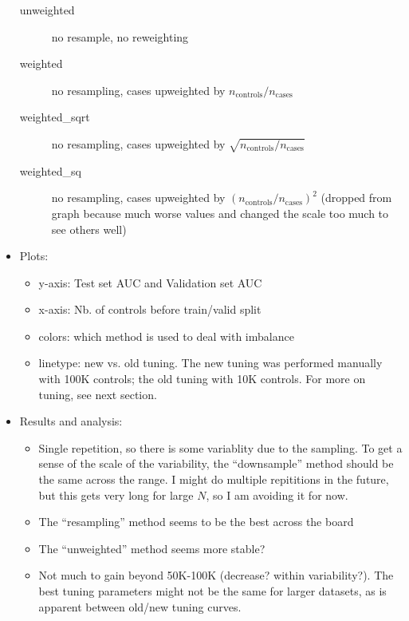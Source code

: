 \documentclass[12pt]{article}
\begin{document}
\begin{itemize}
\begin{description}
		\item[unweighted] no resample, no reweighting
		\item[weighted] no resampling, cases upweighted by $n_{\text{controls}} / n_{\text{cases}}$
		\item[weighted\_sqrt] no resampling, cases upweighted by $\sqrt{n_{\text{controls}} / n_{\text{cases}}}$
		\item[weighted\_sq] no resampling, cases upweighted by $(n_{\text{controls}} / n_{\text{cases}})^2$ (dropped from graph because much worse values and changed the scale too much to see others well)
	\end{description}
	\item Plots:
	\begin{itemize}
		\item y-axis: Test set AUC and Validation set AUC
		\item x-axis: Nb. of controls before train/valid split
		\item colors: which method is used to deal with imbalance
		\item linetype: new vs. old tuning. The new tuning was performed manually with 100K controls; the old tuning with 10K controls. For more on tuning, see next section.
	\end{itemize}
	\item Results and analysis:
	\begin{itemize}
		\item Single repetition, so there is some variablity due to the sampling. To get a sense of the scale of the variability, the ``downsample'' method should be the same across the range. I might do multiple repititions in the future, but this gets very long for large $N$, so I am avoiding it for now.
		\item The ``resampling'' method seems to be the best across the board
		\item The ``unweighted'' method seems more stable?
		\item Not much to gain beyond 50K-100K (decrease? within variability?). The best tuning parameters might not be the same for larger datasets, as is apparent between old/new tuning curves.
	\end{itemize}
\end{itemize}
\end{document}
